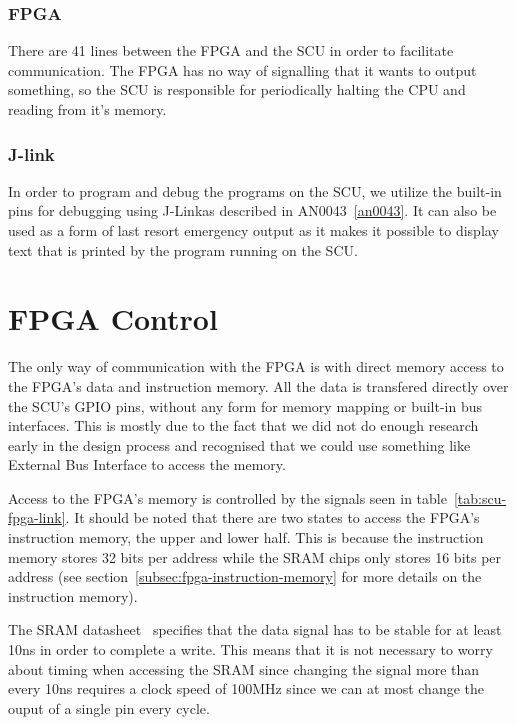 \subsubsection{FPGA}
There are 41 lines between the FPGA and the SCU in order to facilitate communication.
The FPGA has no way of signalling that it wants to output something, so the SCU is responsible for periodically halting the CPU and reading from it's memory.

\subsubsection{J-link}
In order to program and debug the programs on the SCU, we utilize the built-in pins for debugging using J-Link\texttrademark as described in AN0043~\ref{an0043}.
It can also be used as a form of last resort emergency output as it makes it possible to display text that is printed by the program running on the SCU.

\section{FPGA Control}
The only way of communication with the FPGA is with direct memory access to the FPGA's data and instruction memory.
All the data is transfered directly over the SCU's GPIO pins, without any form for memory mapping or built-in bus interfaces.
This is mostly due to the fact that we did not do enough research early in the design process and recognised that we could use something like External Bus Interface to access the memory.

Access to the FPGA's memory is controlled by the signals seen in table~\ref{tab:scu-fpga-link}.
It should be noted that there are two states to access the FPGA's instruction memory, the upper and lower half.
This is because the instruction memory stores 32 bits per address while the SRAM chips only stores 16 bits per address (see section~\ref{subsec:fpga-instruction-memory} for more details on the instruction memory).

The SRAM datasheet~\cite{sram-datasheet} specifies that the data signal has to be stable for at least 10ns in order to complete a write.
This means that it is not necessary to worry about timing when accessing the SRAM since changing the signal more than every 10ns requires a clock speed of 100MHz since we can at most change the ouput of a single pin every cycle.

